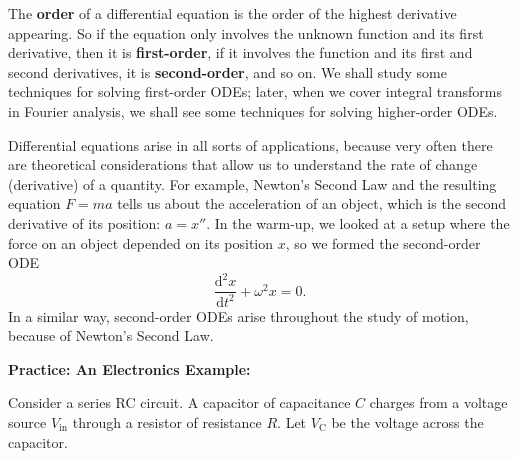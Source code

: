 \documentclass{article}
\newcommand{\deriv}[3][]{\frac{\mathrm{d}^{#1}#2}{\mathrm{d}#3^{#1}}}
\begin{document}
The \textbf{order} of a differential equation is the order of the highest derivative appearing. So if the equation only involves the unknown function and its first derivative, then it is \textbf{first-order}, if it involves the function and its first and second derivatives, it is \textbf{second-order}, and so on. We shall study some techniques for solving first-order ODEs; later, when we cover integral transforms in Fourier analysis, we shall see some techniques for solving higher-order ODEs.\medskip

Differential equations arise in all sorts of applications, because very often there are theoretical considerations that allow us to understand the rate of change (derivative) of a quantity. For example, Newton's Second Law and the resulting equation $F=ma$ tells us about the acceleration of an object, which is the second derivative of its position: $a=x''$. In the warm-up, we looked at a setup where the force on an object depended on its position $x$, so we formed the second-order ODE
\[\deriv[2]{x}{t}+\omega^2 x=0.\]
In a similar way, second-order ODEs arise throughout the study of motion, because of Newton's Second Law.




\clearpage


\textbf{Practice: An Electronics Example:}\bigskip


Consider a series RC circuit. A capacitor of capacitance $C$ charges from a voltage source $V_\mathrm{in}$ through a resistor of resistance $R$. Let $V_\mathrm{C}$ be the voltage across the capacitor.\medskip
\end{document}

